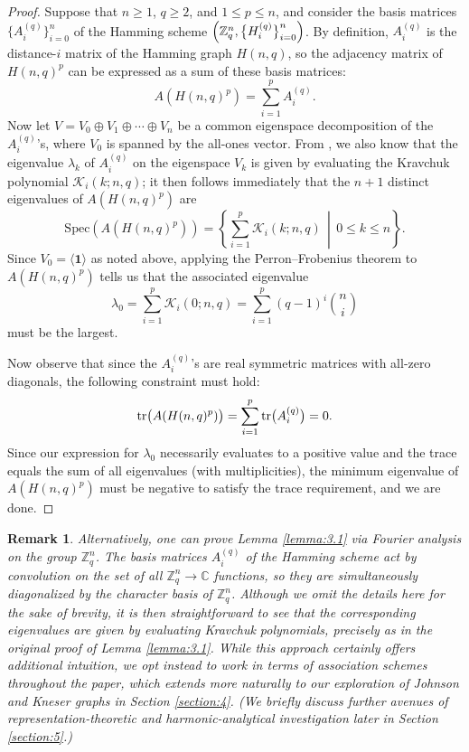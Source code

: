\documentclass{article}
\newcommand\tr{\mathop{\rm tr}\nolimits}
\def\C{\mathbb{C}}
\def\Z{\mathbb{Z}}
\def\K{\mathcal{K}}
\def\1{\mathbf{1}}
\numberwithin{equation}{section}
\theoremstyle{plain}
\newtheorem{remark}[theorem]{Remark}
\begin{document}
\begin{proof}
    Suppose that $n \ge 1$, $q \ge 2$, and $1 \le p \le n$, and consider the basis matrices $\bigl\{A_i^{(q)}\bigr\}_{i = 0}^n$ of the Hamming scheme $\Bigl(\Z_q^n, \bigl\{H_i^{(q)}\bigr\}_{i = 0}^n\Bigr)$. By definition, $A_i^{(q)}$ is the distance-$i$ matrix of the Hamming graph $H(n, q)$, so the adjacency matrix of $H(n, q)^p$ can be expressed as a sum of these basis matrices:
    \[A(H(n, q)^p) = \sum_{i = 1}^p A_i^{(q)}.\]
    Now let $V = V_0 \oplus V_1 \oplus \cdots \oplus V_n$ be a common eigenspace decomposition of the $A_i^{(q)}$'s, where $V_0$ is spanned by the all-ones vector. From \cite[pp. 209--210]{BI84}, we also know that the eigenvalue $\lambda_k$ of $A_i^{(q)}$ on the eigenspace $V_k$ is given by evaluating the Kravchuk polynomial $\K_i(k; n, q)$; it then follows immediately that the $n + 1$ distinct eigenvalues of $A(H(n, q)^p)$ are
    \[\mathrm{Spec}(A(H(n, q)^p)) = \left\{\sum_{i = 1}^p \K_i(k; n, q)\, \middle|\, 0 \le k \le n\right\}.\]
    Since $V_0 = \langle \1 \rangle$ as noted above, applying the Perron--Frobenius theorem to $A(H(n, q)^p)$ tells us that the associated eigenvalue
    \[\lambda_0 = \sum_{i = 1}^p \K_i(0; n, q) = \sum_{i = 1}^p (q - 1)^i \binom{n}{i}\]
    must be the largest.

    Now observe that since the $A_i^{(q)}$'s are real symmetric matrices with all-zero diagonals, the following constraint must hold:
    \[\tr\bigl(A(H(n, q)^p)\bigr) = \sum_{i = 1}^p \tr\bigl(A_i^{(q)}\bigr) = 0.\]
    Since our expression for $\lambda_0$ necessarily evaluates to a positive value and the trace equals the sum of all eigenvalues (with multiplicities), the minimum eigenvalue of $A(H(n, q)^p)$ must be negative to satisfy the trace requirement, and we are done.
\end{proof}

\begin{remark}\label{remark:3.2}
Alternatively, one can prove Lemma \ref{lemma:3.1} via Fourier analysis on the group $\Z_q^n$. The basis matrices $A_i^{(q)}$ of the Hamming scheme act by convolution on the set of all $\Z_q^n \to \C$ functions, so they are simultaneously diagonalized by the character basis of $\Z_q^n$. Although we omit the details here for the sake of brevity, it is then straightforward to see that the corresponding eigenvalues are given by evaluating Kravchuk polynomials, precisely as in the original proof of Lemma \ref{lemma:3.1}. While this approach certainly offers additional intuition, we opt instead to work in terms of association schemes throughout the paper, which extends more naturally to our exploration of Johnson and Kneser graphs in Section \ref{section:4}. (We briefly discuss further avenues of representation-theoretic and harmonic-analytical investigation later in Section \ref{section:5}.)
\end{remark}
\end{document}

